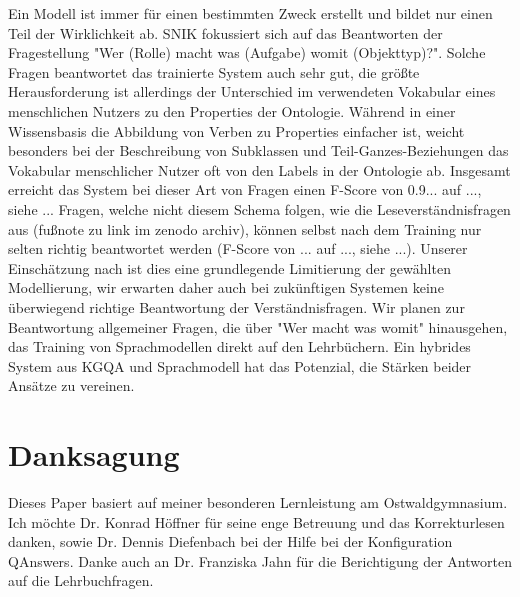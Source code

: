 \documentclass[utf8,biblatex]{lni}
\begin{document}
Ein Modell ist immer für einen bestimmten Zweck erstellt und bildet nur einen Teil der Wirklichkeit ab.
SNIK fokussiert sich auf das Beantworten der Fragestellung "Wer (Rolle) macht was (Aufgabe) womit (Objekttyp)?".
Solche Fragen beantwortet das trainierte System auch sehr gut, die größte Herausforderung ist allerdings der Unterschied im verwendeten Vokabular eines menschlichen Nutzers zu den Properties der Ontologie.
Während in einer Wissensbasis die Abbildung von Verben zu Properties einfacher ist, weicht besonders bei der Beschreibung von Subklassen und Teil-Ganzes-Beziehungen das Vokabular menschlicher Nutzer oft von den Labels in der Ontologie ab.
Insgesamt erreicht das System bei dieser Art von Fragen  einen F-Score von 0.9... auf ..., siehe ...
Fragen, welche nicht diesem Schema folgen, wie die Leseverständnisfragen aus \cite{bb} (fußnote zu link im zenodo archiv), können selbst nach dem Training nur selten richtig beantwortet werden (F-Score von ... auf ..., siehe ...).
Unserer Einschätzung nach ist dies eine grundlegende Limitierung der gewählten Modellierung, wir erwarten daher auch bei zukünftigen Systemen keine überwiegend richtige Beantwortung der Verständnisfragen.
Wir planen zur Beantwortung allgemeiner Fragen, die über "Wer macht was womit" hinausgehen, das Training von Sprachmodellen direkt auf den Lehrbüchern.
Ein hybrides System aus KGQA und Sprachmodell hat das Potenzial, die Stärken beider Ansätze zu vereinen.

\section{Danksagung}

Dieses Paper basiert auf meiner besonderen Lernleistung am Ostwaldgymnasium.
Ich möchte Dr. Konrad Höffner für seine enge Betreuung und das Korrekturlesen danken, sowie Dr. Dennis Diefenbach bei der Hilfe bei der Konfiguration QAnswers.
Danke auch an Dr. Franziska Jahn für die Berichtigung der Antworten auf die Lehrbuchfragen. 

\printbibliography
\end{document}
